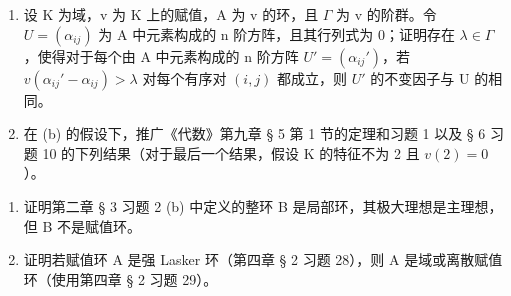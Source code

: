 \begin{enumerate}
\def\labelenumi{(\alph{enumi})}
\setcounter{enumi}{1}
\item
  设 K 为域，v 为 K 上的赋值，A 为 v 的环，且 \(\Gamma\) 为 v 的阶群。令 \(U = (\alpha_{ij})\) 为 A 中元素构成的 n 阶方阵，且其行列式为 0；证明存在 \(\lambda \in \Gamma\)，使得对于每个由 A 中元素构成的 n 阶方阵 \(U' = (\alpha_{ij}')\)，若 \(v(\alpha_{ij}' - \alpha_{ij}) > \lambda\) 对每个有序对 \((i,j)\) 都成立，则 \(U'\) 的不变因子与 U 的相同。
\item
  在 (b) 的假设下，推广《代数》第九章 § 5 第 1 节的定理和习题 1 以及 § 6 习题 10 的下列结果（对于最后一个结果，假设 K 的特征不为 2 且 \(v(2) = 0\)）。
\end{enumerate}

\begin{enumerate}
\def\labelenumi{\arabic{enumi}.}
\setcounter{enumi}{6}
\item
  证明第二章 § 3 习题 2 (b) 中定义的整环 B 是局部环，其极大理想是主理想，但 B 不是赋值环。
\item
  证明若赋值环 A 是强 Lasker 环（第四章 § 2 习题 28），则 A 是域或离散赋值环（使用第四章 § 2 习题 29）。
\end{enumerate}
